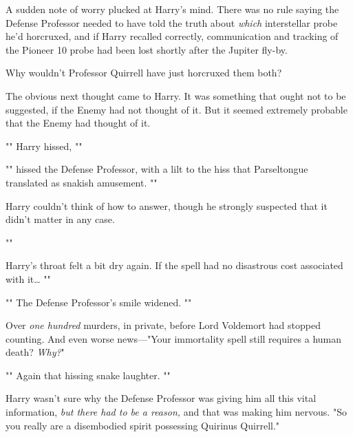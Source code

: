A sudden note of worry plucked at Harry's mind. There was no rule saying the
Defense Professor needed to have told the truth about \emph{which} interstellar
probe he'd horcruxed, and if Harry recalled correctly, communication and
tracking of the Pioneer 10 probe had been lost shortly after the Jupiter fly-by.

Why wouldn't Professor Quirrell have just horcruxed them both?

The obvious next thought came to Harry. It was something that ought not to be
suggested, if the Enemy had not thought of it. But it seemed extremely probable
that the Enemy had thought of it.

"" Harry hissed, ""

"" hissed the Defense Professor, with a lilt to the hiss
that Parseltongue translated as snakish amusement. ""

Harry couldn't think of how to answer, though he strongly suspected that it
didn't matter in any case.

""

Harry's throat felt a bit dry again. If the spell had no disastrous cost
associated with it{\ldots} ""

""
The Defense Professor's smile widened. ""

Over \emph{one hundred} murders, in private, before Lord Voldemort had stopped
counting. And even worse news---"Your immortality spell still requires a human
death? \emph{Why?}"

"" Again that hissing snake laughter.
""

Harry wasn't sure why the Defense Professor was giving him all this vital
information, \emph{but there had to be a reason,} and that was making him
nervous. "So you really are a disembodied spirit possessing Quirinus Quirrell."

